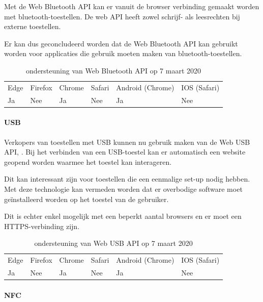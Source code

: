 Met de Web Bluetooth API \autocite{Grant2020} kan er vanuit de browser verbinding gemaakt worden met bluetooth-toestellen. De web API heeft zowel schrijf- als leesrechten bij externe toestellen. 

Er kan dus geconcludeerd worden dat de Web Bluetooth API kan gebruikt worden voor applicaties die gebruik moeten maken van bluetooth-toestellen.

\autocite{Beaufort2019a}

\begin{table}[H]
	\centering
	\begin{tabular}{llllll}
		Edge & Firefox & Chrome & Safari & Android (Chrome) & IOS (Safari) \\
		Ja   & Nee      & Ja     & Nee     & Ja               & Nee          
	\end{tabular}	
	\caption{ondersteuning van Web Bluetooth API op 7 maart 2020}
\end{table}



\paragraph{USB}

Verkopers van toestellen met USB kunnen nu gebruik maken van de Web USB API, \autocite{Rockot2020}. Bij het verbinden van een USB-toestel kan er automatisch een website geopend worden waarmee het toestel kan interageren.
 
Dit kan interessant zijn voor toestellen die een eenmalige set-up nodig hebben. Met deze technologie kan vermeden worden dat er overbodige software moet geïnstalleerd worden op het toestel van de gebruiker. 

Dit is echter enkel mogelijk met een beperkt aantal browsers en er moet een HTTPS-verbinding zijn.

\autocite{Beaufort2019b}

\begin{table}[H]
	\centering
	\begin{tabular}{llllll}
		Edge & Firefox & Chrome & Safari & Android (Chrome) & IOS (Safari) \\
		Ja   & Nee      & Ja     & Nee     & Ja               & Nee          
	\end{tabular}	
	\caption{ondersteuning van Web USB API op 7 maart 2020}
\end{table}


\paragraph{NFC}

